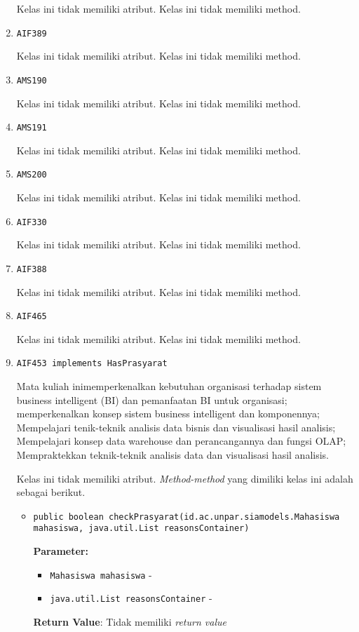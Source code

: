 \documentclass{article}
\begin{document}
\begin{enumerate}
Kelas ini tidak memiliki atribut. Kelas ini tidak memiliki method. \item \texttt{AIF389}



Kelas ini tidak memiliki atribut. Kelas ini tidak memiliki method. \item \texttt{AMS190}



Kelas ini tidak memiliki atribut. Kelas ini tidak memiliki method. \item \texttt{AMS191}



Kelas ini tidak memiliki atribut. Kelas ini tidak memiliki method. \item \texttt{AMS200}



Kelas ini tidak memiliki atribut. Kelas ini tidak memiliki method. \item \texttt{AIF330}



Kelas ini tidak memiliki atribut. Kelas ini tidak memiliki method. \item \texttt{AIF388}



Kelas ini tidak memiliki atribut. Kelas ini tidak memiliki method. \item \texttt{AIF465}



Kelas ini tidak memiliki atribut. Kelas ini tidak memiliki method. \item \texttt{AIF453 implements HasPrasyarat}

Mata kuliah inimemperkenalkan kebutuhan organisasi terhadap sistem business
 intelligent (BI) dan pemanfaatan BI untuk organisasi; memperkenalkan konsep
 sistem business intelligent dan komponennya; Mempelajari tenik-teknik
 analisis data bisnis dan visualisasi hasil analisis; Mempelajari konsep data
 warehouse dan perancangannya dan fungsi OLAP; Mempraktekkan teknik-teknik
 analisis data dan visualisasi hasil analisis.

Kelas ini tidak memiliki atribut. \textit{Method-method} yang dimiliki kelas ini adalah sebagai berikut.
\begin{itemize}
\item \texttt{public boolean checkPrasyarat(id.ac.unpar.siamodels.Mahasiswa mahasiswa, java.util.List reasonsContainer)}



\textbf{Parameter:}
\begin{itemize}
\item \texttt{Mahasiswa mahasiswa} - 
\item \texttt{java.util.List reasonsContainer} - 
\end{itemize}
\textbf{Return Value}: Tidak memiliki \textit{return value}


\end{itemize}
\end{enumerate}
\end{document}
